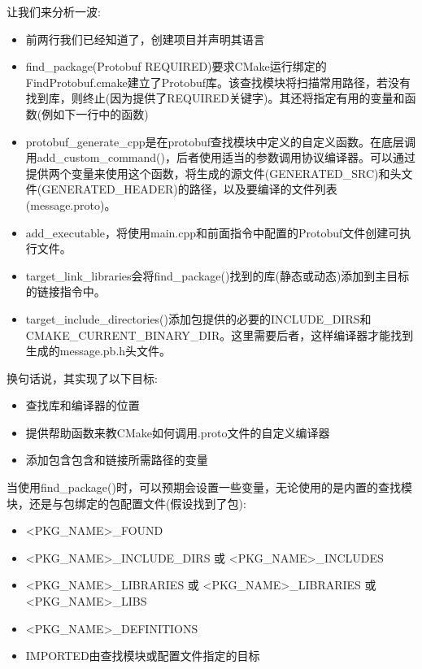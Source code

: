 让我们来分析一波:

\begin{itemize}
\item 
前两行我们已经知道了，创建项目并声明其语言

\item 
find\_package(Protobuf REQUIRED)要求CMake运行绑定的FindProtobuf.cmake建立了Protobuf库。该查找模块将扫描常用路径，若没有找到库，则终止(因为提供了REQUIRED关键字)。其还将指定有用的变量和函数(例如下一行中的函数)

\item 
protobuf\_generate\_cpp是在protobuf查找模块中定义的自定义函数。在底层调用add\_custom\_command()，后者使用适当的参数调用协议编译器。可以通过提供两个变量来使用这个函数，将生成的源文件(GENERATED\_SRC)和头文件(GENERATED\_HEADER)的路径，以及要编译的文件列表(message.proto)。

\item 
add\_executable，将使用main.cpp和前面指令中配置的Protobuf文件创建可执行文件。

\item 
target\_link\_libraries会将find\_package()找到的库(静态或动态)添加到主目标的链接指令中。

\item 
target\_include\_directories()添加包提供的必要的INCLUDE\_DIRS和CMAKE\_CURRENT\_BINARY\_DIR。这里需要后者，这样编译器才能找到生成的message.pb.h头文件。
\end{itemize}

换句话说，其实现了以下目标:

\begin{itemize}
\item 
查找库和编译器的位置

\item 
提供帮助函数来教CMake如何调用.proto文件的自定义编译器

\item 
添加包含包含和链接所需路径的变量
\end{itemize}

当使用find\_package()时，可以预期会设置一些变量，无论使用的是内置的查找模块，还是与包绑定的包配置文件(假设找到了包):

\begin{itemize}
\item 
<PKG\_NAME>\_FOUND

\item 
<PKG\_NAME>\_INCLUDE\_DIRS 或 <PKG\_NAME>\_INCLUDES

\item 
<PKG\_NAME>\_LIBRARIES 或 <PKG\_NAME>\_LIBRARIES 或 <PKG\_NAME>\_LIBS

\item 
<PKG\_NAME>\_DEFINITIONS

\item 
IMPORTED由查找模块或配置文件指定的目标
\end{itemize}

